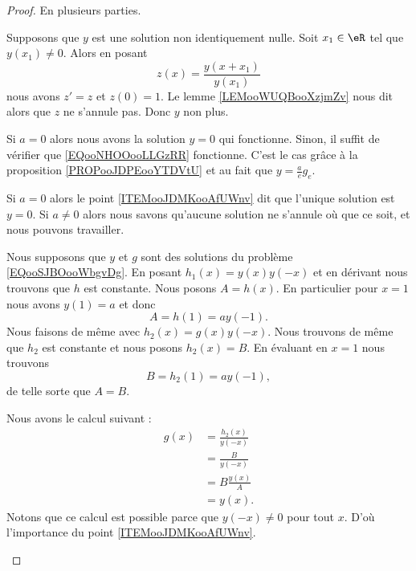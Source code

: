 \begin{proof}
	En plusieurs parties.
	\begin{subproof}
		Supposons que \( y\) est une solution non identiquement nulle. Soit \( x_1\in \eR\) tel que \( y(x_1)\neq 0\). Alors en posant
		\begin{equation}
			z(x)=\frac{ y(x+x_1) }{ y(x_1) }
		\end{equation}
		nous avons \( z'=z\) et \( z(0)=1\). Le lemme \ref{LEMooWUQBooXzjmZv} nous dit alors que \( z\) ne s'annule pas. Donc \( y\) non plus.

		Si \( a=0\) alors nous avons la solution \( y=0\) qui fonctionne. Sinon, il suffit de vérifier que \eqref{EQooNHOOooLLGzRR} fonctionne. C'est le cas grâce à la proposition \ref{PROPooJDPEooYTDVtU} et au fait que \( y=\frac{ a }{ e }g_e\).

		Si \( a=0\) alors le point \ref{ITEMooJDMKooAfUWnv} dit que l'unique solution est \( y=0\). Si \( a\neq 0\) alors nous savons qu'aucune solution ne s'annule où que ce soit, et nous pouvons travailler.

		Nous supposons que \( y\) et \( g\) sont des solutions du problème \eqref{EQooSJBOooWbgvDg}. En posant \( h_1(x)=y(x)y(-x)\) et en dérivant nous trouvons que \( h\) est constante. Nous posons \( A=h(x)\). En particulier pour \( x=1\) nous avons \( y(1)=a\) et donc
		\begin{equation}
			A=h(1)=ay(-1).
		\end{equation}
		Nous faisons de même avec \( h_2(x)=g(x)y(-x)\). Nous trouvons de même que \( h_2\) est constante et nous posons \( h_2(x)=B\). En évaluant en \( x=1\) nous trouvons
		\begin{equation}
			B=h_2(1)=ay(-1),
		\end{equation}
		de telle sorte que \( A=B\).

		Nous avons le calcul suivant :
		\begin{subequations}
			\begin{align}
				g(x) & =\frac{ h_2(x) }{ y(-x) } \\
				     & =\frac{ B }{ y(-x) }      \\
				     & =B\frac{ y(x) }{ A }      \\
				     & =y(x).
			\end{align}
		\end{subequations}
		Notons que ce calcul est possible parce que \( y(-x)\neq 0\) pour tout \( x\). D'où l'importance du point \ref{ITEMooJDMKooAfUWnv}.
	\end{subproof}
\end{proof}

